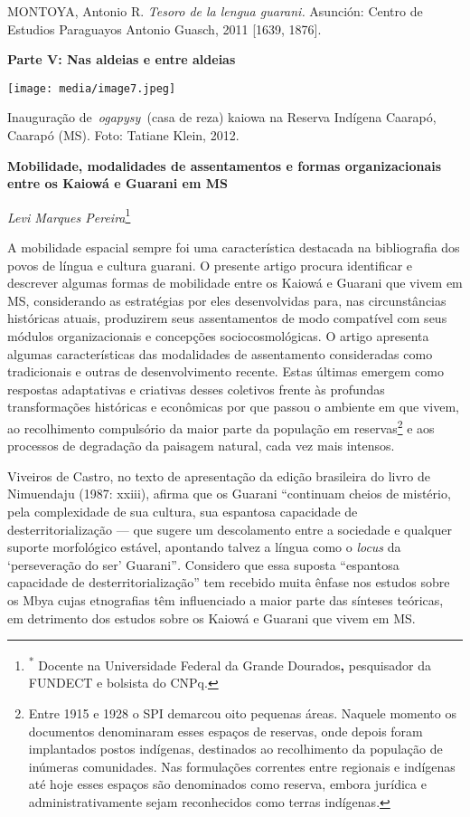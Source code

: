 MONTOYA, Antonio R. \emph{Tesoro de la lengua guarani.} Asunción: Centro
de Estudios Paraguayos Antonio Guasch, 2011 {[}1639, 1876{]}.

\textbf{Parte V: Nas aldeias e entre aldeias}

\texttt{[image: media/image7.jpeg]}

Inauguração de~\emph{ogapysy~}(casa de reza) kaiowa na Reserva Indígena
Caarapó, Caarapó (MS). Foto: Tatiane Klein, 2012.

\textbf{Mobilidade, modalidades de assentamentos e formas
organizacionais entre os Kaiowá e Guarani em MS}

\emph{Levi Marques Pereira}\footnote{\textsuperscript{*} Docente na
  Universidade Federal da Grande Dourados\textbf{,} pesquisador da
  FUNDECT e bolsista do CNPq.}\textbf{\\
}

A mobilidade espacial sempre foi uma característica destacada na
bibliografia dos povos de língua e cultura guarani. O presente artigo
procura identificar e descrever algumas formas de mobilidade entre os
Kaiowá e Guarani que vivem em MS, considerando as estratégias por eles
desenvolvidas para, nas circunstâncias históricas atuais, produzirem
seus assentamentos de modo compatível com seus módulos organizacionais e
concepções sociocosmológicas. O artigo apresenta algumas características
das modalidades de assentamento consideradas como tradicionais e outras
de desenvolvimento recente. Estas últimas emergem como respostas
adaptativas e criativas desses coletivos frente às profundas
transformações históricas e econômicas por que passou o ambiente em que
vivem, ao recolhimento compulsório da maior parte da população em
reservas\footnote{Entre 1915 e 1928 o SPI demarcou oito pequenas áreas.
  Naquele momento os documentos denominaram esses espaços de reservas,
  onde depois foram implantados postos indígenas, destinados ao
  recolhimento da população de inúmeras comunidades. Nas formulações
  correntes entre regionais e indígenas até hoje esses espaços são
  denominados como reserva, embora jurídica e administrativamente sejam
  reconhecidos como terras indígenas.} e aos processos de degradação da
paisagem natural, cada vez mais intensos.

Viveiros de Castro, no texto de apresentação da edição brasileira do
livro de Nimuendaju (1987: xxiii), afirma que os Guarani ``continuam
cheios de mistério, pela complexidade de sua cultura, sua espantosa
capacidade de desterritorialização --- que sugere um descolamento entre
a sociedade e qualquer suporte morfológico estável, apontando talvez a
língua como o \emph{locus} da `perseveração do ser' Guarani''\emph{.}
Considero que essa suposta ``espantosa capacidade de
desterritorialização'' tem recebido muita ênfase nos estudos sobre os
Mbya cujas etnografias têm influenciado a maior parte das sínteses
teóricas, em detrimento dos estudos sobre os Kaiowá e Guarani que vivem
em MS.

